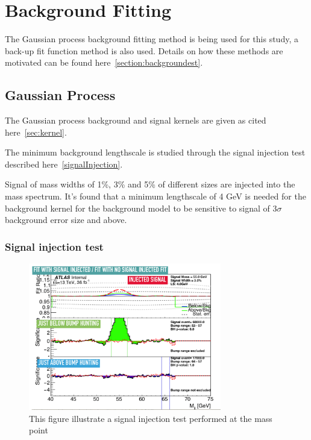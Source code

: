\section{Background Fitting}

The Gaussian process background fitting method is being used for this study, a back-up fit function method is also used. Details on how these methods are motivated can be found here~\ref{section:backgroundest}.  

\subsection{Gaussian Process}

The Gaussian process background and signal kernels are given as cited here~\ref{sec:kernel}.

The minimum background lengthscale is studied through the signal injection test described here~\ref{signalInjection}.

Signal of mass widths of 1\%, 3\% and 5\% of different sizes are injected into the mass spectrum. It's found that a minimum lengthscale of 4 GeV is needed for the background kernel for the background model to be sensitive to signal of 3$\sigma$ background error size and above.


\subsubsection{Signal injection test}
\begin{figure}[!htb]
    \begin{center}
        \includegraphics[width=0.75\textwidth]{figures/chapter_dimuon/signalInjection}        
        \caption{
        This figure illustrate a signal injection test performed at the mass point  }
            \label{fig:dimuonstudies}
    \end{center}
\end{figure}

